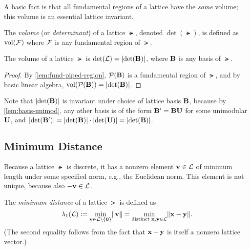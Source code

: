 \documentclass[11pt]{article}
\begin{document}
A basic fact is that all fundamental regions of a lattice have the
\emph{same} volume; this volume is an essential lattice invariant.

\begin{definition}
  \label{def:volume}
  The \emph{volume} (or \emph{determinant}) of a lattice $\lat$,
  denoted $\det(\lat)$, is defined as $\operatorname{vol}(\mathcal{F})$ where $\mathcal{F}$ is
  any fundamental region of $\lat$.
\end{definition}

\begin{claim}
  \label{clm:vol-fund-piped}
  The volume of a lattice $\lat$ is $\det(\mathcal{L}) = \lvert\det(\mathbf{B})\rvert$,
  where $\mathbf{B}$ is any basis of $\lat$.
\end{claim}

\begin{proof}
  By \cref{lem:fund-piped-region}, $\mathcal{P}(\mathbf{B})$ is a
  fundamental region of $\lat$, and by basic linear algebra,
  $\operatorname{vol}(\mathcal{P}(\mathbf{B})) = \lvert\det(\mathbf{B})\rvert$.
\end{proof}

Note that $\lvert\det(\mathbf{B})\rvert$ is invariant under choice of lattice
basis $\mathbf{B}$, because by \cref{lem:basis-unimod}, any other
basis is of the form $\mathbf{B}' = \mathbf{B} \mathbf{U}$ for some unimodular
$\mathbf{U}$, and $\lvert\det(\mathbf{B}')\rvert = \lvert\det(\mathbf{B})\rvert \cdot
\lvert\det(\mathbf{U})\rvert = \lvert\det(\mathbf{B})\rvert$.

\subsection{Minimum Distance}
\label{sec:minimum-distance}

Because a lattice $\lat$ is discrete, it has a nonzero element
$\mathbf{v} \in \mathcal{L}$ of minimum length under some specified norm, e.g.,
the Euclidean norm. This element is not unique, because also
$-\mathbf{v} \in \mathcal{L}$.

\begin{definition}
  \label{def:min-dist}
  The \emph{minimum distance} of a lattice $\lat$ is defined as
  \begin{equation}
    \label{eq:min-dist}
    \lambda_1(\mathcal{L}) := \min_{\mathbf{v} \in \mathcal{L} \setminus \{\mathbf{0}\}}
    \lVert\mathbf{v}\rVert=\min_{\text{distinct } \mathbf{x},\mathbf{y}\in\mathcal{L}} \lVert\mathbf{x}-\mathbf{y}\rVert.
  \end{equation}
  (The second equality follows from the fact that $\mathbf{x}-\mathbf{y}$ is
  itself a nonzero lattice vector.)
\end{definition}
\end{document}
